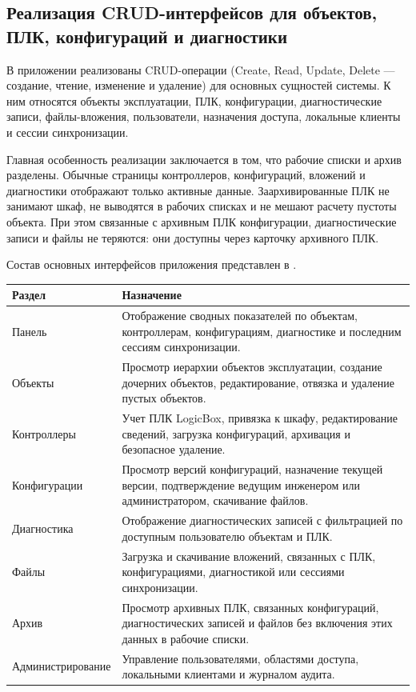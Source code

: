 \subsection{Реализация CRUD-интерфейсов для объектов, ПЛК, конфигураций и диагностики}

В приложении реализованы CRUD-операции (Create, Read, Update, Delete --- создание, чтение, изменение и удаление) для основных сущностей системы. К ним относятся объекты эксплуатации, ПЛК, конфигурации, диагностические записи, файлы-вложения, пользователи, назначения доступа, локальные клиенты и сессии синхронизации.

Главная особенность реализации заключается в том, что рабочие списки и архив разделены. Обычные страницы контроллеров, конфигураций, вложений и диагностики отображают только активные данные. Заархивированные ПЛК не занимают шкаф, не выводятся в рабочих списках и не мешают расчету пустоты объекта. При этом связанные с архивным ПЛК конфигурации, диагностические записи и файлы не теряются: они доступны через карточку архивного ПЛК.

Состав основных интерфейсов приложения представлен в .

\begin{center}
    \small
    \label{tab:chapter3_interfaces}
    \begin{tabularx}{\textwidth}{|>{\raggedright\arraybackslash}p{}|>{\raggedright\arraybackslash}X|}
        \hline
        \textbf{Раздел} & \textbf{Назначение} \\ \hline
        Панель & Отображение сводных показателей по объектам, контроллерам, конфигурациям, диагностике и последним сессиям синхронизации. \\ \hline
        Объекты & Просмотр иерархии объектов эксплуатации, создание дочерних объектов, редактирование, отвязка и удаление пустых объектов. \\ \hline
        Контроллеры & Учет ПЛК LogicBox, привязка к шкафу, редактирование сведений, загрузка конфигураций, архивация и безопасное удаление. \\ \hline
        Конфигурации & Просмотр версий конфигураций, назначение текущей версии, подтверждение ведущим инженером или администратором, скачивание файлов. \\ \hline
        Диагностика & Отображение диагностических записей с фильтрацией по доступным пользователю объектам и ПЛК. \\ \hline
        Файлы & Загрузка и скачивание вложений, связанных с ПЛК, конфигурациями, диагностикой или сессиями синхронизации. \\ \hline
        Архив & Просмотр архивных ПЛК, связанных конфигураций, диагностических записей и файлов без включения этих данных в рабочие списки. \\ \hline
        Администрирование & Управление пользователями, областями доступа, локальными клиентами и журналом аудита. \\ \hline
    \end{tabularx}
    \normalsize
\end{center}

